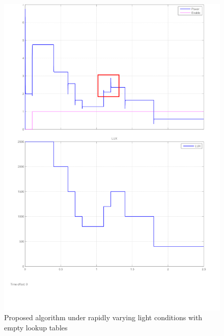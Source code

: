  \begin{figure}[H]
  \begin{center}
  \includegraphics[width=\textwidth]{images/proposed_step_input}
  \caption{Proposed algorithm under rapidly varying light conditions with empty lookup tables }
  \label{fig:proposed_empty_lookup}
  \end{center}
  \end{figure}


